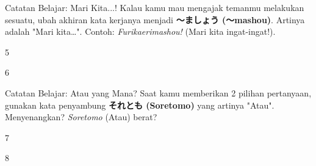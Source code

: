 \begin{lessonbox}{Catatan Belajar: Mari Kita...!}
    Kalau kamu mau mengajak temanmu melakukan sesuatu, ubah akhiran kata kerjanya menjadi \textbf{〜ましょう (〜mashou)}. Artinya adalah "Mari kita\dots". Contoh: \textit{Furikaerimashou!} (Mari kita ingat-ingat!).
\end{lessonbox}

\begin{convobox}{5}
    \noindent
      
     

    \vspace{1.5em}
\end{convobox}

\begin{convobox}{6}
    \noindent
      
     

    \vspace{1.5em}
\end{convobox}

\begin{lessonbox}{Catatan Belajar: Atau yang Mana?}
    Saat kamu memberikan 2 pilihan pertanyaan, gunakan kata penyambung \textbf{それとも (Soretomo)} yang artinya "Atau". Menyenangkan? \textit{Soretomo} (Atau) berat?
\end{lessonbox}

\begin{convobox}{7}
    \noindent
      
     

    \vspace{1.5em}
\end{convobox}

\begin{convobox}{8}
    \noindent

    \vspace{1.5em}
\end{convobox}

